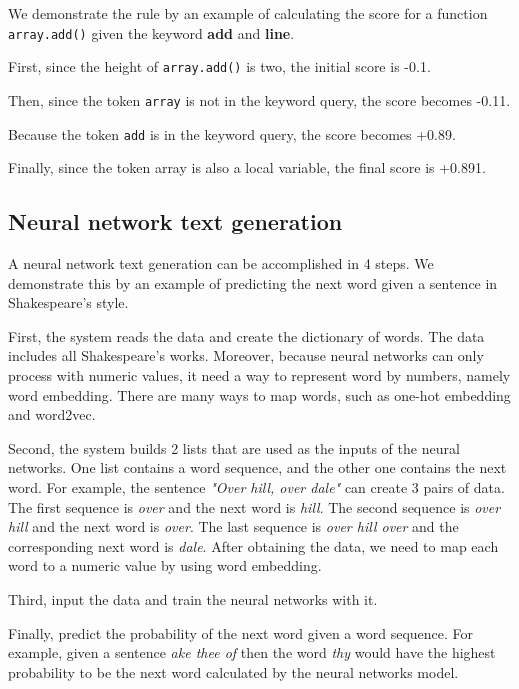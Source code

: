 \documentclass[PRO,english]{ipsj}
\begin{document}

We demonstrate the rule by an example of calculating the score for a function \texttt{array.add()} given the keyword \textbf{add} and \textbf{line}.

First, since the height of \texttt{array.add()} is two, the initial score is -0.1.

Then, since the token \texttt{array} is not in the keyword query, the score becomes -0.11.

Because the token \texttt{add} is in the keyword query, the score becomes +0.89.

Finally, since the token array is also a local variable, the final score is +0.891.

\subsection{Neural network text generation}
A neural network text generation can be accomplished in 4 steps. We demonstrate this by an example of predicting the next word given a sentence in Shakespeare's style. 

First, the system reads the data and create the dictionary of words. The data includes all Shakespeare's works. Moreover, because neural networks can only process with numeric values, it need a way to represent word by numbers, namely word embedding. There are many ways to map words, such as one-hot embedding and word2vec. 

Second, the system builds 2 lists that are used as the inputs of the neural networks. One list contains a word sequence, and the other one contains the next word. For example, the sentence \textit{"Over hill, over dale"} can create 3 pairs of data. The first sequence is \textit{over} and the next word is \textit{hill}. The second sequence is \textit{over hill} and the next word is \textit{over}. The last sequence is \textit{over hill over} and the corresponding next word is \textit{dale}. After obtaining the data, we need to map each word to a numeric value by using word embedding.

Third, input the data and train the neural networks with it. 

Finally, predict the probability of the next word given a word sequence. For example, given a sentence \textit{ake thee of} then the word \textit{thy} would have the highest probability to be the next word calculated by the neural networks model.
\end{document}
